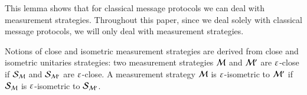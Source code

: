 This lemma shows that for classical message protocols we can deal with measurement strategies. Throughout this paper, since we deal solely with classical message protocols, we will only deal with measurement strategies.

Notions of close and isometric measurement strategies are derived from close and isometric unitaries strategies: two measurement strategies $\mathcal M$ and $\mathcal M'$ are $\varepsilon$-close if $\mathcal{S}_{\mathcal M}$ and $\mathcal{S}_{\mathcal M'}$ are $\varepsilon$-close. A measurement strategy $\mathcal M$ is $\varepsilon$-isometric to $\mathcal M'$ if $\mathcal{S}_{\mathcal M}$ is $\varepsilon$-isometric to $\mathcal{S}_{\mathcal M'}$.  

